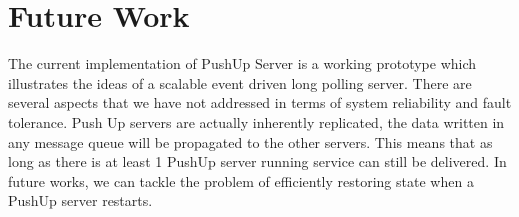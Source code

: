 \section{Future Work}

The current implementation of PushUp Server is a working prototype which illustrates
the ideas of a scalable event driven long polling server. There are several aspects that
we have not addressed in terms of system reliability and fault tolerance. Push Up servers
are actually inherently replicated, the data written in any message queue will be propagated
to the other servers. This means that as long as there is at least 1 PushUp server running
service can still be delivered. In future works, we can tackle the problem of efficiently
restoring state when a PushUp server restarts.